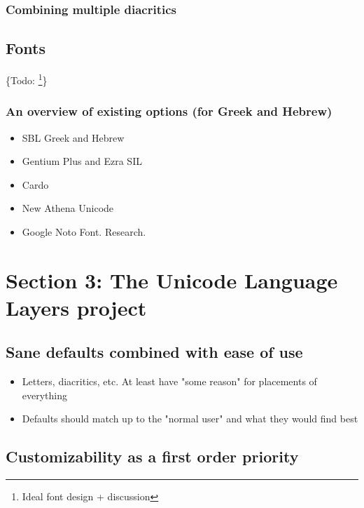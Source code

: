 \documentclass[11pt]{article}
\begin{document}
\subsubsection{Combining multiple diacritics}
\label{sec:orgd2eb9d3}

\subsection{Fonts}
\label{sec:orgc33c3f4}

\{Todo: \footnote{Ideal font design + discussion}\}

\subsubsection{An overview of existing options (for Greek and Hebrew)}
\label{sec:org01d1077}

\begin{itemize}
\item SBL Greek and Hebrew
\item Gentium Plus and Ezra SIL
\item Cardo
\item New Athena Unicode
\item Google Noto Font. Research.
\end{itemize}

\section{Section 3: The Unicode Language Layers project}
\label{sec:org653eefa}

\subsection{Sane defaults combined with ease of use}
\label{sec:orgdf10c09}

\begin{itemize}
\item Letters, diacritics, etc. At least have "some reason" for placements of everything
\item Defaults should match up to the "normal user" and what they would find best
\end{itemize}

\subsection{Customizability as a first order priority}
\label{sec:orgdb4083f}
\end{document}
